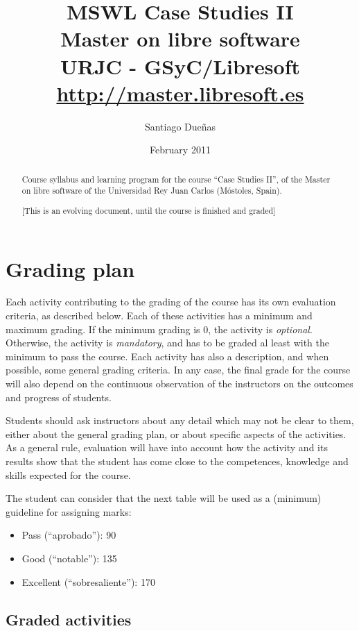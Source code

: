 \documentclass[a4paper]{article}
\title{MSWL Case Studies II \\
Master on libre software \\
URJC - GSyC/Libresoft \\
\url{http://master.libresoft.es}}
\author{Santiago Dueñas}
\date{February 2011}
\begin{document}
\maketitle

\begin{abstract}
Course syllabus and learning program for the course ``Case Studies II'', 
of the Master on libre software of the Universidad Rey Juan Carlos (Móstoles, Spain).

[This is an evolving document, until the course is finished and graded]
\end{abstract}

\tableofcontents

\section{Grading plan}

Each activity contributing to the grading of the course has its own evaluation criteria, 
as described below. Each of these activities has a minimum and maximum grading. If the 
minimum grading is 0, the activity is \textit{optional}. Otherwise, the activity is \textit{mandatory}, and 
has to be graded al least with the minimum to pass the course. Each activity has also a 
description, and when possible, some general grading criteria. In any case, the final grade 
for the course will also depend on the continuous observation of the instructors on the 
outcomes and progress of students.

Students should ask instructors about any detail which may not be clear to them, 
either about the general grading plan, or about specific aspects of the activities. 
As a general rule, evaluation will have into account how the activity and its results 
show that the student has come close to the competences, knowledge and skills expected 
for the course.

The student can consider that the next table will be used as a (minimum) guideline for 
assigning marks:

\begin{itemize}
\item Pass (``aprobado''): 90
\item Good (``notable''): 135
\item Excellent (``sobresaliente''): 170
\end{itemize}

\subsection{Graded activities}
\end{document}
